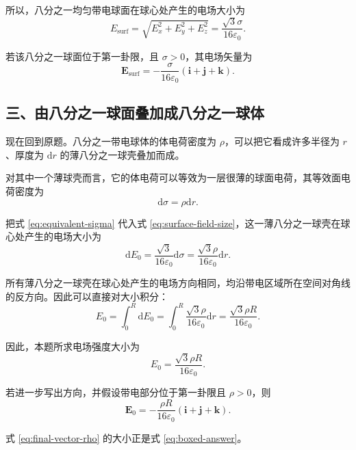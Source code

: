 \documentclass[11pt,a4paper,fontset=fandol]{ctexart}
\newcommand{\dd}{\mathrm{d}}
\newcommand{\eps}{\varepsilon_0}
\begin{document}
所以，八分之一均匀带电球面在球心处产生的电场大小为
\begin{equation}
 E_{\mathrm{surf}}
 =\sqrt{E_x^2+E_y^2+E_z^2}
 =\frac{\sqrt3\sigma}{16\eps}.
 \label{eq:surface-field-size}
\end{equation}

若该八分之一球面位于第一卦限，且 $\sigma>0$，其电场矢量为
\begin{equation}
 \bm E_{\mathrm{surf}}
 =-\frac{\sigma}{16\eps}\left(\bm i+\bm j+\bm k\right).
 \label{eq:surface-field-vector}
\end{equation}

\subsection*{三、由八分之一球面叠加成八分之一球体}
现在回到原题。八分之一带电球体的体电荷密度为 $\rho$，可以把它看成许多半径为 $r$、厚度为 $\dd r$ 的薄八分之一球壳叠加而成。

对其中一个薄球壳而言，它的体电荷可以等效为一层很薄的球面电荷，其等效面电荷密度为
\begin{equation}
 \dd \sigma=\rho\dd r.
 \label{eq:equivalent-sigma}
\end{equation}

把式 \eqref{eq:equivalent-sigma} 代入式 \eqref{eq:surface-field-size}，这一薄八分之一球壳在球心处产生的电场大小为
\begin{equation}
 \dd E_0=\frac{\sqrt3}{16\eps}\dd\sigma
 =\frac{\sqrt3\rho}{16\eps}\dd r.
 \label{eq:dE-shell}
\end{equation}

所有薄八分之一球壳在球心处产生的电场方向相同，均沿带电区域所在空间对角线的反方向。因此可以直接对大小积分：
\begin{equation}
 E_0=\int_0^R\dd E_0
 =\int_0^R\frac{\sqrt3\rho}{16\eps}\dd r
 =\frac{\sqrt3\rho R}{16\eps}.
 \label{eq:final-size-rho}
\end{equation}

因此，本题所求电场强度大小为
\begin{equation}
 \boxed{E_0=\frac{\sqrt3\rho R}{16\eps}}.
 \label{eq:boxed-answer}
\end{equation}

若进一步写出方向，并假设带电部分位于第一卦限且 $\rho>0$，则
\begin{equation}
 \bm E_0=-\frac{\rho R}{16\eps}\left(\bm i+\bm j+\bm k\right).
 \label{eq:final-vector-rho}
\end{equation}

式 \eqref{eq:final-vector-rho} 的大小正是式 \eqref{eq:boxed-answer}。
\end{document}
